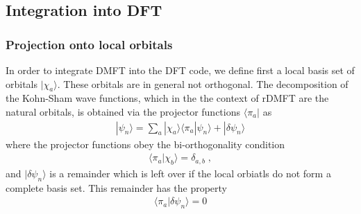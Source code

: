 \documentclass[11pt,a4paper]{report}
\begin{document}
\subsection{Integration into DFT}
\subsubsection{Projection onto local orbitals}
In order to integrate DMFT into the DFT code, we define first a local
basis set of orbitals $|\chi_a\rangle$. These orbitals are in general
not orthogonal. The decomposition of the Kohn-Sham wave functions,
which in the the context of rDMFT are the natural orbitals, is
obtained via the projector functions $\langle\pi_a|$ as
\begin{eqnarray}
|\psi_n\rangle=\sum_a|\chi_a\rangle\langle\pi_a|\psi_n\rangle
+|\delta\psi_n\rangle
\end{eqnarray}
where the projector functions obey the bi-orthogonality condition
\begin{eqnarray}
\langle\pi_a|\chi_b\rangle=\delta_{a,b}\;,
\end{eqnarray}
and $|\delta\psi_n\rangle$ is a remainder which is left over if the
local orbiatls do not form a complete basis set. This remainder has
the property
\begin{eqnarray}
\langle\pi_a|\delta\psi_n\rangle=0
\end{eqnarray}

\end{document}
